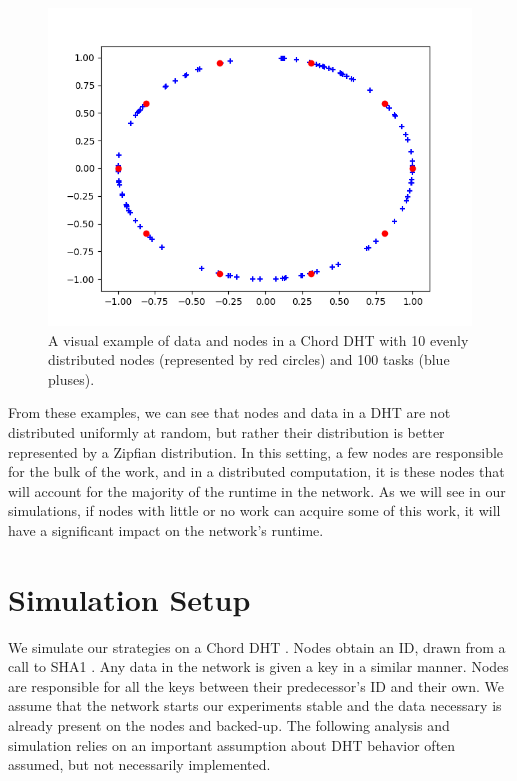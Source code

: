\documentclass[10pt,conference]{IEEEtran}
\begin{document}
\begin{figure}
	\centering
	\includegraphics[width=0.9\linewidth]{figs/exampleChordEvenRedone}
	\caption[Distribution of Tasks in a Chord DHT  with Evenly Distributed Nodes]{A visual example of data and nodes in a Chord DHT with 10 evenly distributed nodes (represented by red circles) and 100 tasks (blue pluses).}
	\label{fig:exampleChordEvenDistribution}
\end{figure}

From these examples, we can see that nodes and data in a DHT are not distributed uniformly at random, but rather their distribution is better represented by  a Zipfian distribution.
In this setting, a few nodes are responsible for the bulk of the work, and in a distributed computation, it is these nodes that will account for the majority of the runtime in the network.
As we will see in our simulations, if nodes with little or no work can acquire some of this work, it will have a significant impact on the network's runtime.


\section{Simulation Setup}
\label{sec:auto-simulation}


We simulate our strategies on a Chord DHT \cite{chord}.
Nodes obtain an ID, drawn from a call to SHA1 \cite{sha1}.
Any data in the network is given a key in a similar manner.
Nodes are responsible for all the keys between their predecessor's ID and their own.
We assume that the network starts our experiments stable and the data necessary is already present on the nodes and backed-up.
The following analysis and simulation relies on an important assumption about DHT behavior often assumed, but not necessarily implemented.
\end{document}
